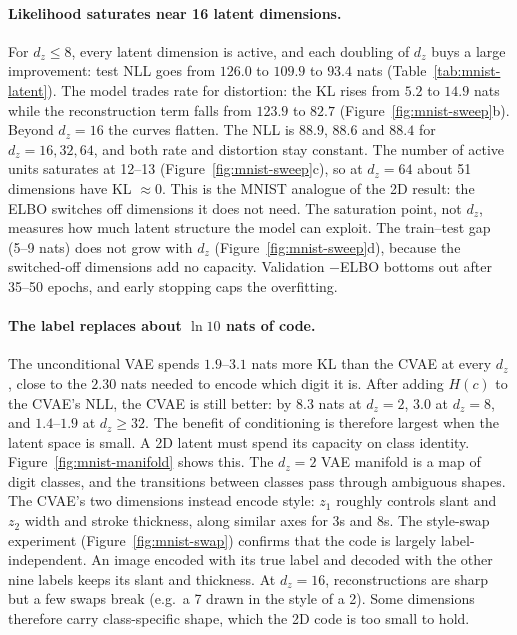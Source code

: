 \documentclass[10pt]{article}
\begin{document}
\paragraph{Likelihood saturates near 16 latent dimensions.}
For $d_z\le8$, every latent dimension is active, and each doubling of $d_z$
buys a large improvement: test NLL goes from $126.0$ to $109.9$ to $93.4$
nats (Table~\ref{tab:mnist-latent}). The model trades rate for distortion:
the KL rises from $5.2$ to $14.9$ nats while the reconstruction term falls
from $123.9$ to $82.7$ (Figure~\ref{fig:mnist-sweep}b). Beyond $d_z=16$
the curves flatten. The NLL is $88.9$, $88.6$ and $88.4$ for $d_z=16,32,64$,
and both rate and distortion stay constant. The number of active units
saturates at 12--13 (Figure~\ref{fig:mnist-sweep}c), so at $d_z=64$ about 51
dimensions have KL $\approx0$. This is the MNIST analogue of the 2D result:
the ELBO switches off dimensions it does not need. The saturation point, not
$d_z$, measures how much latent structure the model can exploit. The
train--test gap (5--9 nats) does not grow with $d_z$
(Figure~\ref{fig:mnist-sweep}d), because the switched-off dimensions add no
capacity. Validation $-$ELBO bottoms out after 35--50 epochs, and early
stopping caps the overfitting.

\paragraph{The label replaces about $\ln 10$ nats of code.}
The unconditional VAE spends $1.9$--$3.1$ nats more KL than the CVAE at
every $d_z$, close to the $2.30$ nats needed to encode which digit it is.
After adding $H(c)$ to the CVAE's NLL, the CVAE is still better: by $8.3$
nats at $d_z=2$, $3.0$ at $d_z=8$, and $1.4$--$1.9$ at $d_z\ge32$. The
benefit of conditioning is therefore largest when the latent space is small.
A 2D latent must spend its capacity on class identity.
Figure~\ref{fig:mnist-manifold} shows this. The $d_z=2$ VAE manifold is a
map of digit classes, and the transitions between classes pass through
ambiguous shapes. The CVAE's two dimensions instead encode style: $z_1$
roughly controls slant and $z_2$ width and stroke thickness, along similar
axes for 3s and 8s. The style-swap experiment
(Figure~\ref{fig:mnist-swap}) confirms that the code is largely
label-independent. An image encoded with its true label and decoded with
the other nine labels keeps its slant and thickness. At $d_z=16$,
reconstructions are sharp but a few swaps break (e.g.\ a 7 drawn in the
style of a 2). Some dimensions therefore carry class-specific shape, which
the 2D code is too small to hold.
\end{document}
